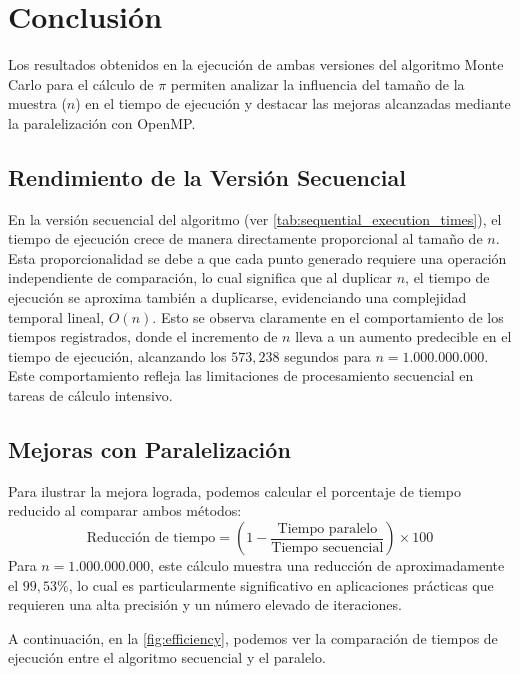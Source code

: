 \documentclass[a4paper, 10pt, onecolumn]{IEEEtran}
\begin{document}
\section{Conclusión}

Los resultados obtenidos en la ejecución de ambas versiones del algoritmo Monte Carlo para el cálculo de $\pi$ permiten analizar la influencia del tamaño de la muestra ($n$) en el tiempo de ejecución y destacar las mejoras alcanzadas mediante la paralelización con OpenMP.

\subsection{Rendimiento de la Versión Secuencial}

En la versión secuencial del algoritmo (ver \cref{tab:sequential_execution_times}), el tiempo de ejecución crece de manera directamente proporcional al tamaño de $n$. Esta proporcionalidad se debe a que cada punto generado requiere una operación independiente de comparación, lo cual significa que al duplicar $n$, el tiempo de ejecución se aproxima también a duplicarse, evidenciando una complejidad temporal lineal, $O(n)$. Esto se observa claramente en el comportamiento de los tiempos registrados, donde el incremento de $n$ lleva a un aumento predecible en el tiempo de ejecución, alcanzando los $573,238$ segundos para $n = 1.000.000.000$. Este comportamiento refleja las limitaciones de procesamiento secuencial en tareas de cálculo intensivo.

\subsection{Mejoras con Paralelización}
Para ilustrar la mejora lograda, podemos calcular el porcentaje de tiempo reducido al comparar ambos métodos:
\[
\text{Reducción de tiempo} = \left(1 - \frac{\text{Tiempo paralelo}}{\text{Tiempo secuencial}}\right) \times 100
\]
Para $n = 1.000.000.000$, este cálculo muestra una reducción de aproximadamente el $99,53\%$, lo cual es particularmente significativo en aplicaciones prácticas que requieren una alta precisión y un número elevado de iteraciones.

A continuación, en la \cref{fig:efficiency}, podemos ver la comparación de tiempos de ejecución entre el algoritmo secuencial y el paralelo.
\end{document}
